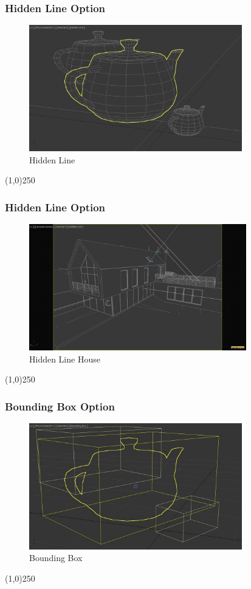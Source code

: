 \begin{frame}
\frametitle{Hidden Line Option}
\begin{figure}
	\centering
	\includegraphics[height=5.5cm]{img/ViewportOptions/HiddenLine.jpg}
	\caption{Hidden Line}
	\label{fig:HiddenLine}
\end{figure}
\end{frame}
\begin{center}\line(1,0){250}\end{center}


\begin{frame}
\frametitle{Hidden Line Option}
\begin{figure}
	\centering
	\includegraphics[height=5.5cm]{img/ViewportOptions/HiddenLineHouse.jpg}
	\caption{Hidden Line House}
	\label{fig:HiddenLineHouse}
\end{figure}
\end{frame}
\begin{center}\line(1,0){250}\end{center}

\begin{frame}
\frametitle{Bounding Box Option}
\begin{figure}
	\centering
	\includegraphics[height=5.5cm]{img/ViewportOptions/BoundingBox.jpg}
	\caption{Bounding Box}
	\label{fig:BoundingBox}
\end{figure}
\end{frame}
\begin{center}\line(1,0){250}\end{center}


